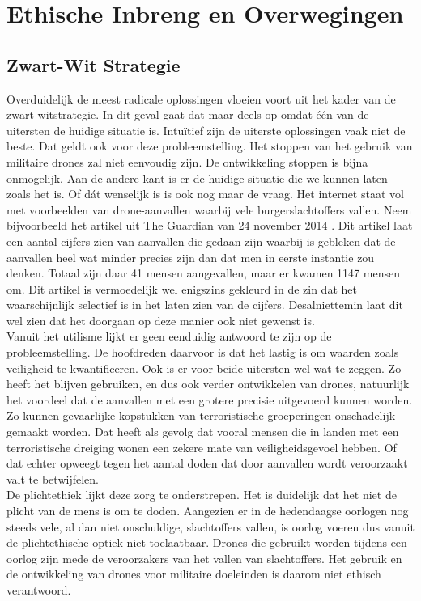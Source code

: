 \section{Ethische Inbreng en Overwegingen}
\subsection{Zwart-Wit Strategie}\label{chapter:zwart-wit}
\subtitle{Job Van Staveren}
Overduidelijk de meest radicale oplossingen vloeien voort uit het kader van de zwart-witstrategie. In dit geval gaat dat maar deels op omdat \'e\'en van de uitersten de huidige situatie is. Intu\"itief zijn de uiterste oplossingen vaak niet de beste. Dat geldt ook voor deze probleemstelling. Het stoppen van het gebruik van militaire drones zal niet eenvoudig zijn. De ontwikkeling stoppen is bijna onmogelijk. Aan de andere kant is er de huidige situatie die we kunnen laten zoals het is. Of d\'at wenselijk is is ook nog maar de vraag. Het internet staat vol met voorbeelden van drone-aanvallen waarbij vele burgerslachtoffers vallen. Neem bijvoorbeeld het artikel uit The Guardian van 24 november 2014 \cite{guardian}. Dit artikel laat een aantal cijfers zien van aanvallen die gedaan zijn waarbij is gebleken dat de aanvallen heel wat minder precies zijn dan dat men in eerste instantie zou denken. Totaal zijn daar 41 mensen aangevallen, maar er kwamen 1147 mensen om. Dit artikel is vermoedelijk wel enigszins gekleurd in de zin dat het waarschijnlijk selectief is in het laten zien van de cijfers. Desalniettemin laat dit wel zien dat het doorgaan op deze manier ook niet gewenst is.\\

Vanuit het utilisme lijkt er geen eenduidig antwoord te zijn op de probleemstelling. De hoofdreden daarvoor is dat het lastig is om waarden zoals veiligheid te kwantificeren. Ook is er voor beide uitersten wel wat te zeggen. Zo heeft het blijven gebruiken, en dus ook verder ontwikkelen van drones, natuurlijk het voordeel dat de aanvallen met een grotere precisie uitgevoerd kunnen worden. Zo kunnen gevaarlijke kopstukken van terroristische groeperingen onschadelijk gemaakt worden. Dat heeft als gevolg dat vooral mensen die in landen met een terroristische dreiging wonen een zekere mate van veiligheidsgevoel hebben. Of dat echter opweegt tegen het aantal doden dat door aanvallen wordt veroorzaakt valt te betwijfelen.\\

De plichtethiek lijkt deze zorg te onderstrepen. Het is duidelijk dat het niet de plicht van de mens is om te doden. Aangezien er in de hedendaagse oorlogen nog steeds vele, al dan niet onschuldige, slachtoffers vallen, is oorlog voeren dus vanuit de plichtethische optiek niet toelaatbaar. Drones die gebruikt worden tijdens een oorlog zijn mede de veroorzakers van het vallen van slachtoffers. Het gebruik en de ontwikkeling van drones voor militaire doeleinden is daarom niet ethisch verantwoord. \\

